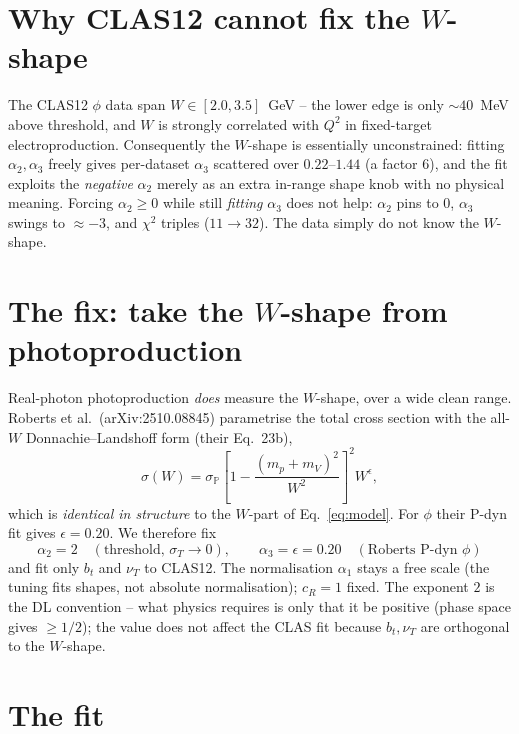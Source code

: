 \documentclass[11pt]{article}
\begin{document}
\section{Why CLAS12 cannot fix the $W$-shape}

The CLAS12 $\phi$ data span $W\in[2.0,3.5]$~GeV -- the lower edge is only
$\sim40$~MeV above threshold, and $W$ is strongly correlated with $Q^2$ in
fixed-target electroproduction. Consequently the $W$-shape is essentially
unconstrained: fitting $\alpha_2,\alpha_3$ freely gives per-dataset
$\alpha_3$ scattered over $0.22$--$1.44$ (a factor $6$), and the fit exploits
the \emph{negative} $\alpha_2$ merely as an extra in-range shape knob with no
physical meaning. Forcing $\alpha_2\ge0$ while still \emph{fitting} $\alpha_3$
does not help: $\alpha_2$ pins to $0$, $\alpha_3$ swings to $\approx-3$, and
$\chi^2$ triples ($11\to32$). The data simply do not know the $W$-shape.

\section{The fix: take the $W$-shape from photoproduction}

Real-photon photoproduction \emph{does} measure the $W$-shape, over a wide
clean range. Roberts et al.\ (arXiv:2510.08845) parametrise the total cross
section with the all-$W$ Donnachie--Landshoff form (their Eq.~23b),
\begin{equation}
\sigma(W)=\sigma_{\mathbb P}\left[1-\frac{(m_p+m_V)^2}{W^2}\right]^{2}W^{\epsilon},
\label{eq:23b}
\end{equation}
which is \emph{identical in structure} to the $W$-part of
Eq.~\eqref{eq:model}. For $\phi$ their P-dyn fit gives $\epsilon=0.20$. We
therefore fix
\begin{equation}
\boxed{\ \alpha_2=2\quad(\text{threshold, }\sigma_T\to0),\qquad
\alpha_3=\epsilon=0.20\quad(\text{Roberts P-dyn }\phi)\ }
\end{equation}
and fit only $b_t$ and $\nu_T$ to CLAS12. The normalisation $\alpha_1$ stays a
free scale (the tuning fits shapes, not absolute normalisation);
$c_R=1$ fixed. The exponent $2$ is the DL convention -- what physics requires
is only that it be positive (phase space gives $\ge1/2$); the value does not
affect the CLAS fit because $b_t,\nu_T$ are orthogonal to the $W$-shape.

\section{The fit}
\end{document}
